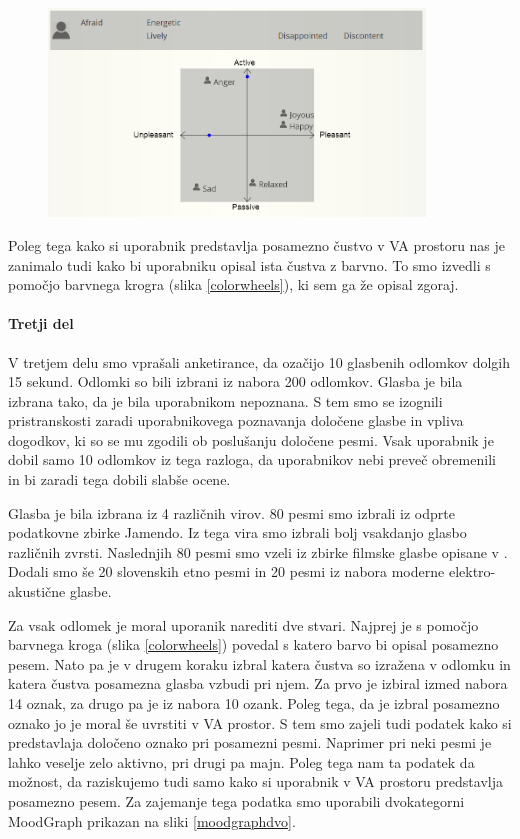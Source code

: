 \documentclass[a4paper, 12pt]{book}
\begin{document}
{\begin{figure}[ht]
\centering
\includegraphics[width=10cm]{images/moodgraph.png}

\caption{}
\label{moodgraph}
\end{figure}

Poleg tega kako si uporabnik predstavlja posamezno čustvo v VA prostoru nas je zanimalo tudi kako bi uporabniku opisal ista čustva z barvno. To smo izvedli s pomočjo barvnega krogra (slika \ref{colorwheels}), ki sem ga že opisal zgoraj. 

\paragraph{Tretji del}

V tretjem delu smo vprašali anketirance, da ozačijo 10 glasbenih odlomkov dolgih 15 sekund. Odlomki so bili izbrani iz nabora 200 odlomkov. Glasba je bila izbrana tako, da je bila uporabnikom nepoznana. S tem smo se izognili pristranskosti zaradi uporabnikovega poznavanja določene glasbe in vpliva dogodkov, ki so se mu zgodili ob poslušanju določene pesmi. Vsak uporabnik je dobil samo 10 odlomkov iz tega razloga, da uporabnikov nebi preveč obremenili in bi zaradi tega dobili slabše ocene. 

Glasba je bila izbrana iz 4 različnih virov. 80 pesmi smo izbrali iz odprte podatkovne zbirke Jamendo. Iz tega vira smo izbrali bolj vsakdanjo glasbo različnih zvrsti. Naslednjih 80 pesmi smo vzeli iz zbirke filmske glasbe opisane v \cite{eerola2010comparison}. Dodali smo še 20 slovenskih etno pesmi in 20 pesmi iz nabora moderne elektro-akustične glasbe. 

Za vsak odlomek je moral uporanik narediti dve stvari. Najprej je s pomočjo barvnega kroga (slika \ref{colorwheels}) povedal s katero barvo bi opisal posamezno pesem. Nato pa je v drugem koraku izbral katera čustva so izražena v odlomku in katera čustva posamezna glasba vzbudi pri njem. Za prvo je izbiral izmed nabora 14 oznak, za drugo pa je iz nabora 10 ozank. Poleg tega, da je izbral posamezno oznako jo je moral še uvrstiti v VA prostor. S tem smo zajeli tudi podatek kako si predstavlaja določeno oznako pri posamezni pesmi. Naprimer pri neki pesmi je lahko veselje zelo aktivno, pri drugi pa majn. Poleg tega nam ta podatek da možnost, da raziskujemo tudi samo kako si uporabnik v VA prostoru predstavlja posamezno pesem. Za zajemanje tega podatka smo uporabili dvokategorni MoodGraph prikazan na sliki \ref{moodgraphdvo}.

}
\end{document}
